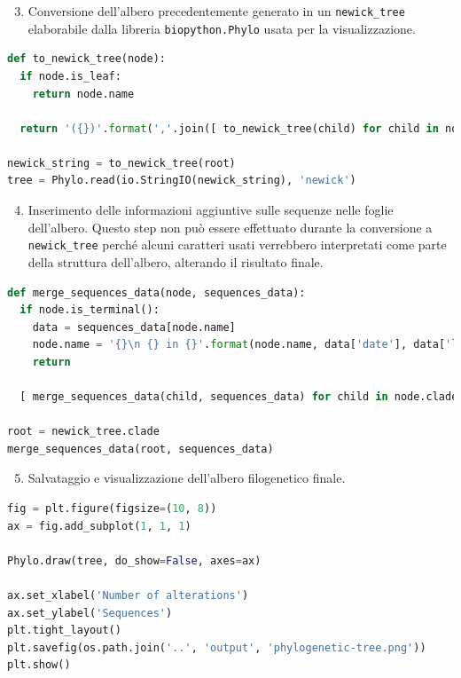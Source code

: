 \documentclass[11pt,italian]{article}
\begin{document}
\begin{enumerate}
  \setcounter{enumi}{2}
  \item Conversione dell'albero precedentemente generato in un \lstinline{newick_tree} elaborabile dalla libreria \lstinline{biopython.Phylo} usata per la visualizzazione.
\end{enumerate}

\begin{lstlisting}[caption=Funzione di conversione in Newick Tree,label=code:newick_tree_function,language=Python]
def to_newick_tree(node):
  if node.is_leaf:
    return node.name

  return '({})'.format(','.join([ to_newick_tree(child) for child in node.children ]))

newick_string = to_newick_tree(root)
tree = Phylo.read(io.StringIO(newick_string), 'newick')
\end{lstlisting}

\begin{enumerate}
  \setcounter{enumi}{3}
  \item Inserimento delle informazioni aggiuntive sulle sequenze nelle foglie dell'albero. Questo step non può essere effettuato durante la conversione a \lstinline{newick_tree} perché alcuni caratteri usati verrebbero interpretati come parte della struttura dell'albero, alterando il risultato finale.
\end{enumerate}
\begin{lstlisting}[caption=Funzione per l'inserimento dei dati nelle foglie dell'albero,label=code:merge_sequence_data_function,language=Python]
def merge_sequences_data(node, sequences_data):
  if node.is_terminal():
    data = sequences_data[node.name]
    node.name = '{}\n {} in {}'.format(node.name, data['date'], data['location'])
    return

  [ merge_sequences_data(child, sequences_data) for child in node.clades ]

root = newick_tree.clade
merge_sequences_data(root, sequences_data)
\end{lstlisting}

\begin{enumerate}
  \setcounter{enumi}{4}
  \item Salvataggio e visualizzazione dell'albero filogenetico finale.
\end{enumerate}
\begin{lstlisting}[caption=Salvataggio e visualizzazione dell'albero filogenetico finale,label=code:build_tree_function,language=Python]
fig = plt.figure(figsize=(10, 8))
ax = fig.add_subplot(1, 1, 1)

Phylo.draw(tree, do_show=False, axes=ax)

ax.set_xlabel('Number of alterations')
ax.set_ylabel('Sequences')
plt.tight_layout()
plt.savefig(os.path.join('..', 'output', 'phylogenetic-tree.png'))
plt.show()
\end{lstlisting}
\end{document}
